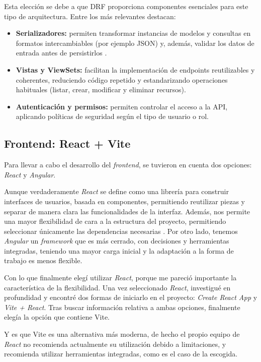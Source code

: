 Esta elección se debe a que  DRF proporciona componentes esenciales para este tipo de arquitectura. Entre los más relevantes destacan:
\begin{itemize}
	\item \textbf{Serializadores:} permiten transformar instancias de modelos y consultas en formatos intercambiables (por ejemplo JSON) y, además, validar los datos de entrada antes de persistirlos \cite{drf:serializers}.
	\item \textbf{Vistas y ViewSets:} facilitan la implementación de endpoints reutilizables y coherentes, reduciendo código repetido y estandarizando operaciones habituales (listar, crear, modificar y eliminar recursos).
	\item \textbf{Autenticación y permisos:} permiten controlar el acceso a la API, aplicando políticas de seguridad según el tipo de usuario o rol.
\end{itemize}

\subsection{Frontend: React + Vite}

Para llevar a cabo el desarrollo del \textit{frontend}, se tuvieron en cuenta dos opciones: \textit{React} y \textit{Angular}.

Aunque verdaderamente \textit{React} se define como una librería para construir interfaces de usuarios, basada en componentes, permitiendo reutilizar piezas y separar de manera clara las funcionalidades de la interfaz. Además, nos permite una mayor flexibilidad de cara a la estructura del proyecto, permitiendo seleccionar únicamente las dependencias necesarias \cite{react}. Por otro lado, tenemos \textit{Angular} un \textit{framework} que es más cerrado, con decisiones y herramientas integradas, teniendo una mayor carga inicial y la adaptación a la forma de trabajo es menos flexible.

Con lo que finalmente elegí utilizar \textit{React}, porque me pareció importante la característica de la flexibilidad. 
Una vez seleccionado \textit{React}, investigué en profundidad y encontré dos formas de iniciarlo en el proyecto: \textit{Create React App} y \textit{Vite + React}. Tras buscar información relativa a ambas opciones, finalmente elegía la opción que contiene Vite.

Y es que Vite es una alternativa más moderna, de hecho el propio equipo de \textit{React} no recomienda actualmente su utilización debido a limitaciones, y recomienda utilizar herramientas integradas, como es el caso de la escogida.


